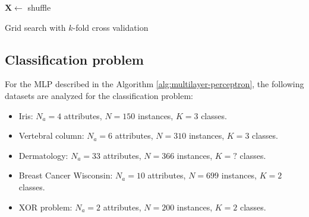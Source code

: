 \documentclass[12pt,a4paper]{article}
\begin{document}
\begin{algorithm}[H]
    \DontPrintSemicolon
      
      
    \(\mathbf{X} \leftarrow\) shuffle
    

    \caption{Grid search with \(k\)-fold cross validation}
    \label{alg:grid-search-k-fold-cross-validation}
\end{algorithm}

\subsection{Classification problem}

For the MLP described in the Algorithm \ref{alg:multilayer-perceptron}, the following datasets are analyzed for the classification problem:
\begin{itemize}
    \item Iris: \(N_a = 4\) attributes, \(N = 150\) instances, \(K =3\) classes.
    \item Vertebral column: \(N_a = 6\) attributes, \(N = 310\) instances, \(K =3\) classes.
    \item Dermatology: \(N_a = 33\) attributes, \(N = 366\) instances, \(K = ?\) classes.
    \item Breast Cancer Wisconsin: \(N_a = 10\) attributes, \(N = 699\) instances, \(K = 2\) classes.
    \item XOR problem: \(N_a = 2\) attributes, \(N = 200\) instances, \(K = 2\) classes.
\end{itemize}
\end{document}
